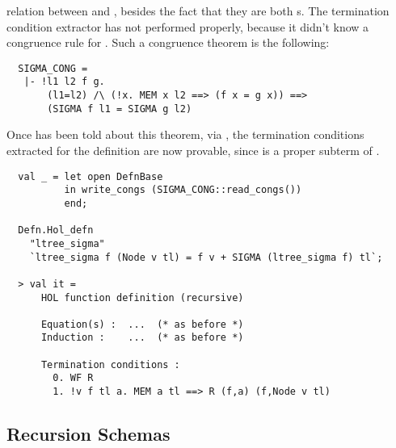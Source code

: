 relation between  and , besides the fact 
that they are both s. The termination condition extractor 
has not performed properly, because it didn't know a congruence rule 
for . Such a congruence theorem is the following:
%
\begin{hol}
\begin{verbatim}
  SIGMA_CONG =
   |- !l1 l2 f g.
       (l1=l2) /\ (!x. MEM x l2 ==> (f x = g x)) ==>
       (SIGMA f l1 = SIGMA g l2)
\end{verbatim}
\end{hol}
%
Once  has been told about this theorem, via 
, the termination conditions extracted for 
the definition are now provable, since  is a 
proper subterm of .
%
\begin{session}
\begin{hol}
\begin{verbatim}
  val _ = let open DefnBase
          in write_congs (SIGMA_CONG::read_congs())
          end;
 
  Defn.Hol_defn
    "ltree_sigma"
    `ltree_sigma f (Node v tl) = f v + SIGMA (ltree_sigma f) tl`;
 
  > val it =
      HOL function definition (recursive)
 
      Equation(s) :  ...  (* as before *)
      Induction :    ...  (* as before *)
 
      Termination conditions :
        0. WF R
        1. !v f tl a. MEM a tl ==> R (f,a) (f,Node v tl)
\end{verbatim}
\end{hol}
\end{session}

\subsection{Recursion Schemas}

